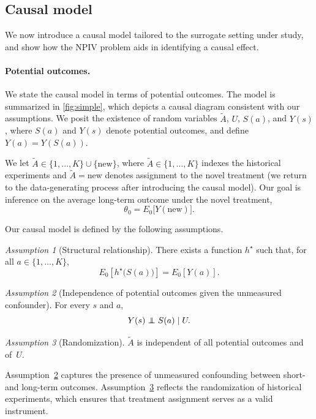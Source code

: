 \documentclass[11pt]{article}
\newcommand{\new}{\mathrm{new}}
\newcommand\independent{\protect\mathpalette{\protect\independenT}{\perp}}
\def\independenT#1#2{\mathrel{\rlap{$#1#2$}\mkern2mu{#1#2}}}
\theoremstyle{plain}
\theoremstyle{definition}
\theoremstyle{remark}
\newtheorem{assumption}{Assumption}
\theoremstyle{definition}
\begin{document}
\subsection{Causal model}

  We now introduce a causal model tailored to the surrogate setting under study, and show how the NPIV problem aids in identifying a causal effect.

\paragraph{Potential outcomes.}
We state the causal model in terms of potential outcomes. The model is summarized in \cref{fig:simple}, which depicts a causal diagram consistent with our assumptions. We posit the existence of random variables $\widetilde A$, $U$, $S(a)$, and $Y(s)$, where $S(a)$ and $Y(s)$ denote potential outcomes, and define $Y(a) = Y(S(a))$.

We let $\widetilde A \in \{1,\ldots,K\} \cup \{\new\}$, where $\widetilde A \in \{1,\ldots,K\}$ indexes the historical experiments and $\widetilde A=\new$ denotes assignment to the novel treatment (we return to the data-generating process after introducing the causal model). Our goal is inference on the average long-term outcome under the novel treatment,
\[
\theta_0 = E_0\big[Y(\new)\big].
\]

Our causal model is defined by the following assumptions.

\begin{assumption}[Structural relationship]\label{asm:structural_relationship}
There exists a function $h^\star$ such that, for all $a \in \{1,\ldots,K\}$,
\[
E_0\!\left[h^\star\!\big(S(a)\big)\right] = E_0\!\left[Y(a)\right].
\]
\end{assumption}

\begin{assumption}[Independence of potential outcomes given the unmeasured confounder]\label{asm:indep_pot_outcomes}
For every $s$ and $a$,
\[
Y(s)\independent S(a) \mid U.
\]
\end{assumption}

\begin{assumption}[Randomization]\label{asm:randomization}
$\widetilde A$ is independent of all potential outcomes and of~$U$.
\end{assumption}

Assumption~\ref{asm:indep_pot_outcomes} captures the presence of unmeasured confounding between short- and long-term outcomes. Assumption~\ref{asm:randomization} reflects the randomization of historical experiments, which ensures that treatment assignment serves as a valid instrument.
\end{document}
